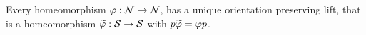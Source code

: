Every homeomorphism $\varphi: \mathcal{N} \to \mathcal{N}$, has a unique orientation preserving lift, that is a homeomorphism $\widetilde{\varphi}: \mathcal{S} \to \mathcal{S}$ with $p\widetilde{\varphi}=\varphi p$. %
%

